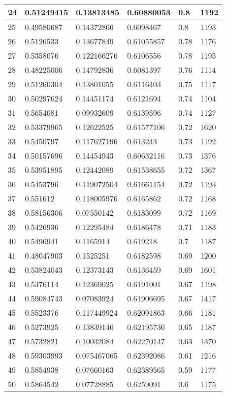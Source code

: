 \begin{longtable}{|l|l|l|l|l|l|}
24 & 0.51249415 & 0.13813485 & 0.60880053 & 0.8 & 1192 \\ \hline 
25 & 0.49580687 & 0.14372866 & 0.6098467 & 0.8 & 1193 \\ \hline 
26 & 0.5126533 & 0.13677849 & 0.61055857 & 0.78 & 1176 \\ \hline 
27 & 0.5358076 & 0.122166276 & 0.6106556 & 0.78 & 1193 \\ \hline 
28 & 0.48225006 & 0.14792836 & 0.6081397 & 0.76 & 1114 \\ \hline 
29 & 0.51260304 & 0.13801055 & 0.6116403 & 0.75 & 1117 \\ \hline 
30 & 0.50297624 & 0.14451174 & 0.6121694 & 0.74 & 1104 \\ \hline 
31 & 0.5654081 & 0.09932609 & 0.6139596 & 0.74 & 1127 \\ \hline 
32 & 0.53379965 & 0.12622525 & 0.61577106 & 0.72 & 1620 \\ \hline 
33 & 0.5450797 & 0.117627196 & 0.613243 & 0.73 & 1192 \\ \hline 
34 & 0.50157696 & 0.14454943 & 0.60632116 & 0.73 & 1376 \\ \hline 
35 & 0.53951895 & 0.12442089 & 0.61538655 & 0.72 & 1367 \\ \hline 
36 & 0.5453796 & 0.119072504 & 0.61661154 & 0.72 & 1193 \\ \hline 
37 & 0.551612 & 0.118005976 & 0.6165862 & 0.72 & 1168 \\ \hline 
38 & 0.58156306 & 0.07550142 & 0.6183099 & 0.72 & 1169 \\ \hline 
39 & 0.5426936 & 0.12295484 & 0.6186478 & 0.71 & 1183 \\ \hline 
40 & 0.5496941 & 0.1165914 & 0.619218 & 0.7 & 1187 \\ \hline 
41 & 0.48047903 & 0.1525251 & 0.6182598 & 0.69 & 1200 \\ \hline 
42 & 0.53824043 & 0.12373143 & 0.6136459 & 0.69 & 1601 \\ \hline 
43 & 0.5376114 & 0.12369025 & 0.6191001 & 0.67 & 1198 \\ \hline 
44 & 0.59084743 & 0.07083924 & 0.61906695 & 0.67 & 1417 \\ \hline 
45 & 0.5523376 & 0.117449924 & 0.62091863 & 0.66 & 1181 \\ \hline 
46 & 0.5273925 & 0.13839146 & 0.62195736 & 0.65 & 1187 \\ \hline 
47 & 0.5732821 & 0.10032084 & 0.62270147 & 0.63 & 1370 \\ \hline 
48 & 0.59303993 & 0.075467065 & 0.62392086 & 0.61 & 1216 \\ \hline 
49 & 0.5854938 & 0.07660163 & 0.62389565 & 0.59 & 1177 \\ \hline 
50 & 0.5864542 & 0.07728885 & 0.6259091 & 0.6 & 1175 \\ \hline 
\end{longtable}
